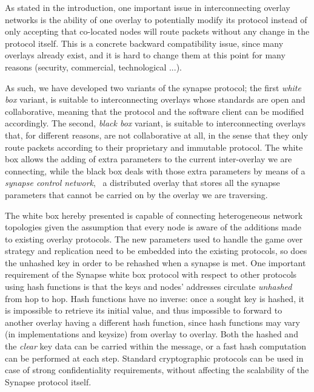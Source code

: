 %
%
As stated in the introduction, one important issue in interconnecting
overlay networks is the ability of one overlay to potentially
modify its protocol instead of only accepting that co-located nodes
will route packets without any change in the protocol itself. This is
a concrete backward compatibility issue, since many overlays already
exist, and it is hard to change them at this point for many reasons (security,
commercial, technological ...).

As such, we have developed two variants of the synapse protocol; the
first \emph{white box} variant, is suitable to interconnecting overlays
whose standards are open and collaborative, meaning that the protocol and
the software client can be modified accordingly.  The second,
\emph{black box} variant, is suitable to interconnecting overlays that,
for different reasons, are not collaborative at all, in the sense that
they only route packets according to their proprietary and immutable
protocol. The white box allows the adding of extra parameters to the current
inter-overlay we are connecting, while the black box deals with those
extra parameters by means of a \emph{synapse control network}, \ie\ a
distributed overlay that stores all the synapse parameters that cannot
be carried on by the overlay we are traversing.

%
%
The white box hereby presented is capable of connecting heterogeneous
network topologies given the assumption that every node is aware of
the additions made to existing overlay protocols. The new parameters
used to handle the game over strategy and replication need to be
embedded into the existing protocols, so does the unhashed key in
order to be rehashed when a synapse is met.  One important requirement
of the Synapse white box protocol with respect to other protocols
using hash functions is that the keys and nodes' addresses circulate
\emph{unhashed} from hop to hop. Hash functions have no inverse: once
a sought key is hashed, it is impossible to retrieve its initial
value, and thus impossible to forward to another overlay having a
different hash function, since hash functions may vary (in
implementations and keysize) from overlay to overlay.  Both the hashed
and the \emph{clear} key data can be carried within the message, or a
fast hash computation can be performed at each step. Standard
cryptographic protocols can be used in case of strong confidentiality
requirements, without affecting the scalability of the Synapse
protocol itself.


